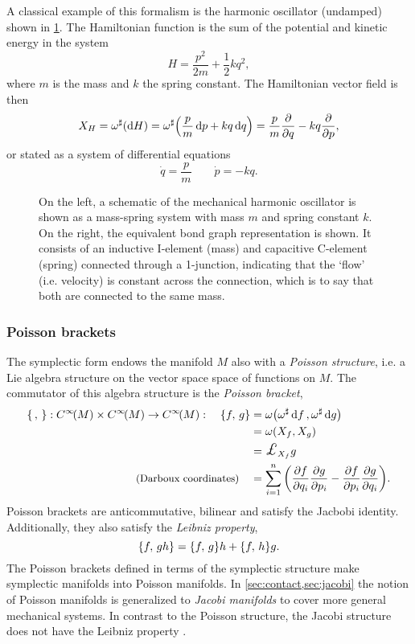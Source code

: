 A classical example of this formalism is the harmonic oscillator (undamped) shown in \cref{fig:ho}. The Hamiltonian function is the sum of the potential and kinetic energy in the system
$$ H = \frac{p^2}{2m} + \frac{1}{2}kq^2,$$
where $m$ is the mass and $k$ the spring constant. The Hamiltonian vector field is then 
$$ X_H = \omega^\sharp\qty(\dd{H}) = \omega^\sharp\qty(\frac{p}{m}\dd{p} + kq\dd{q}) = \frac{p}{m}\pdv{}{q} - kq \pdv{}{p}, $$
or stated as a system of differential equations
$$ \dot{q} = \frac{p}{m} \qquad \dot{p} = -kq. $$
\begin{figure}[ht]
    \centering
    
    \caption{On the left, a schematic of the mechanical harmonic oscillator is shown as a mass-spring system with mass $m$ and spring constant $k$. On the right, the equivalent bond graph representation is shown. It consists of an inductive I-element (mass) and capacitive C-element (spring) connected through a 1-junction, indicating that the `flow' (i.e. velocity) is constant across the connection, which is to say that both are connected to the same mass.}
    \label{fig:ho}
\end{figure}

\subsubsection{Poisson brackets}
The symplectic form endows the manifold $M$ also with a \emph{Poisson structure}, i.e. a Lie algebra structure on the vector space space of functions on $M$. The commutator of this algebra structure is the \emph{Poisson bracket},
\begin{equation}
    \begin{split}
        \poisson{\,}{}: \functions{M} \times \functions{M} \to \functions{M}: \quad  
        \poisson{f}{g} &= \omega\qty(\fromDual{\omega}\dd{f}, \fromDual{\omega}\dd{g})  \\
                       &= \omega\qty(X_f, X_g) \\
                       &= \lied{X_f}{g} \\
        \text{\small (Darboux coordinates)} \quad &= \sum_{i = 1}^n \qty(\pdv{f}{q_i}\pdv{g}{p_i} - \pdv{f}{p_i}\pdv{g}{q_i}).
    \end{split}
\end{equation}
Poisson brackets are anticommutative, bilinear and satisfy the Jacbobi identity. Additionally, they also satisfy the \emph{Leibniz property}, 
$$ 
    \qty{f,\,gh} = \qty{f,\,g} h + \qty{f,\,h} g. 
$$
The Poisson brackets defined in terms of the symplectic structure make symplectic manifolds into Poisson manifolds. In \cref{sec:contact,sec:jacobi} the notion of Poisson manifolds is generalized to \emph{Jacobi manifolds} to cover more general mechanical systems. In contrast to the Poisson structure, the Jacobi structure does not have the Leibniz property \cite{Arnold1989,Libermann1987}.

